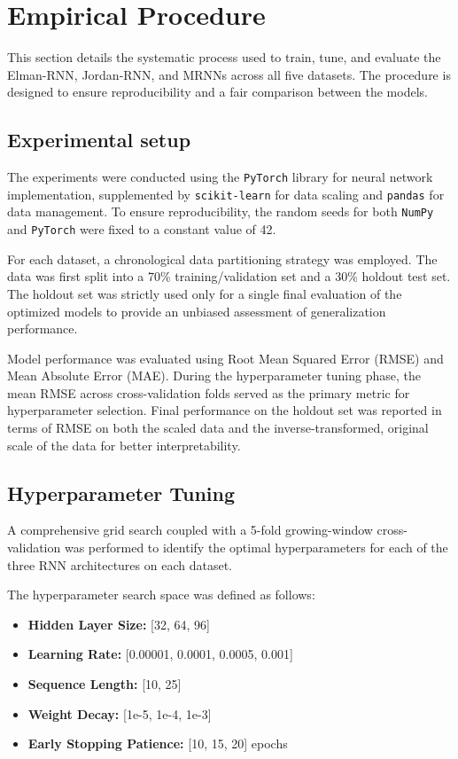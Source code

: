 \documentclass[conference, 10pt]{IEEEtran}
\begin{document}
\section{Empirical Procedure}
This section details the systematic process used to train, tune, and evaluate the Elman-RNN, Jordan-RNN, and MRNNs across all
five datasets. The procedure is designed to ensure reproducibility and a fair comparison between the models.

\subsection{Experimental setup}
The experiments were conducted using the \texttt{PyTorch} library for neural network implementation, supplemented by \texttt{scikit-learn}
for data scaling and \texttt{pandas} for data management. To ensure reproducibility, the random seeds for both \texttt{NumPy} and \texttt{PyTorch}
were fixed to a constant value of 42.

For each dataset, a chronological data partitioning strategy was employed. The data was first split into a 70\%
training/validation set and a 30\% holdout test set. The holdout set was strictly used only for a single final evaluation
of the optimized models to provide an unbiased assessment of generalization performance.

Model performance was evaluated using Root Mean Squared Error (RMSE) and Mean Absolute Error (MAE). During the
hyperparameter tuning phase, the mean RMSE across cross-validation folds served as the primary metric for hyperparameter
selection. Final performance on the holdout set was reported in terms of RMSE on both the scaled data and the
inverse-transformed, original scale of the data for better interpretability.

\subsection{Hyperparameter Tuning}
A comprehensive grid search coupled with a 5-fold growing-window cross-validation was performed to identify the optimal
hyperparameters for each of the three RNN architectures on each dataset.

The hyperparameter search space was defined as follows:

\begin{itemize}
    \item \textbf{Hidden Layer Size:} [32, 64, 96]
    \item \textbf{Learning Rate:} [0.00001, 0.0001, 0.0005, 0.001]
    \item \textbf{Sequence Length:} [10, 25]
    \item \textbf{Weight Decay:} [1e-5, 1e-4, 1e-3]
    \item \textbf{Early Stopping Patience:} [10, 15, 20] epochs
\end{itemize}
\end{document}

